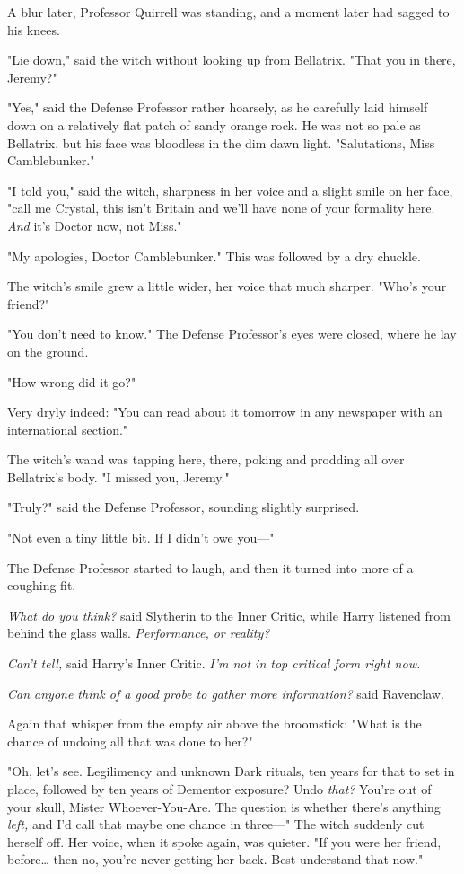 A blur later, Professor Quirrell was standing, and a moment later had sagged to 
his knees.

"Lie down," said the witch without looking up from Bellatrix. "That you in 
there, Jeremy?"

"Yes," said the Defense Professor rather hoarsely, as he carefully laid himself 
down on a relatively flat patch of sandy orange rock. He was not so pale as 
Bellatrix, but his face was bloodless in the dim dawn light. "Salutations, Miss 
Camblebunker."

"I told you," said the witch, sharpness in her voice and a slight smile on her 
face, "call me Crystal, this isn't Britain and we'll have none of your 
formality here. \emph{And} it's Doctor now, not Miss."

"My apologies, Doctor Camblebunker." This was followed by a dry chuckle.

The witch's smile grew a little wider, her voice that much sharper. "Who's your 
friend?"

"You don't need to know." The Defense Professor's eyes were closed, where he 
lay on the ground.

"How wrong did it go?"

Very dryly indeed: "You can read about it tomorrow in any newspaper with an 
international section."

The witch's wand was tapping here, there, poking and prodding all over 
Bellatrix's body. "I missed you, Jeremy."

"Truly?" said the Defense Professor, sounding slightly surprised.

"Not even a tiny little bit. If I didn't owe you---"

The Defense Professor started to laugh, and then it turned into more of a 
coughing fit.

\emph{What do you think?} said Slytherin to the Inner Critic, while Harry 
listened from behind the glass walls. \emph{Performance, or reality?}

\emph{Can't tell,} said Harry's Inner Critic. \emph{I'm not in top critical 
form right now.}

\emph{Can anyone think of a good probe to gather more information?} said 
Ravenclaw.

Again that whisper from the empty air above the broomstick: "What is the chance 
of undoing all that was done to her?"

"Oh, let's see. Legilimency and unknown Dark rituals, ten years for that to set 
in place, followed by ten years of Dementor exposure? Undo\emph{ that?} You're 
out of your skull, Mister Whoever-You-Are. The question is whether there's 
anything \emph{left,} and I'd call that maybe one chance in three---" The witch 
suddenly cut herself off. Her voice, when it spoke again, was quieter. "If you 
were her friend, before{\ldots} then no, you're never getting her back. Best 
understand that now."


